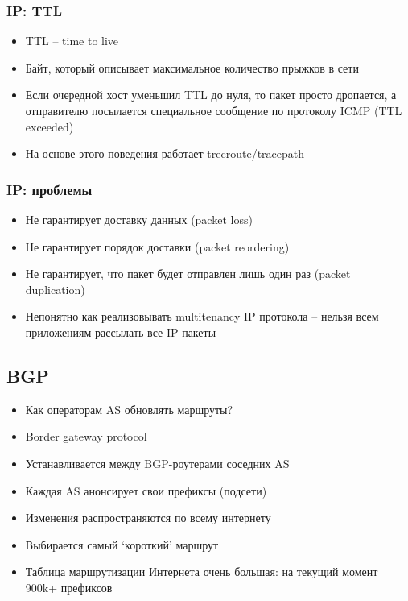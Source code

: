   \subsubsection{IP: TTL}
    \begin{itemize}
      \item TTL -- time to live
      \item Байт, который описывает максимальное количество прыжков в сети
      \item Если очередной хост уменьшил TTL до нуля, то пакет просто дропается, а отправителю посылается специальное сообщение по протоколу ICMP (TTL exceeded)
      \item На основе этого поведения работает trecroute/tracepath
    \end{itemize}
  
  \subsubsection{IP: проблемы}
    \begin{itemize}
      \item Не гарантирует доставку данных (packet loss)
      \item Не гарантирует порядок доставки (packet reordering)
      \item Не гарантирует, что пакет будет отправлен лишь один раз (packet duplication)
      \item Непонятно как реализовывать multitenancy IP протокола – нельзя всем приложениям рассылать все IP-пакеты
    \end{itemize}
  
  \subsection{BGP}
    \begin{itemize}
      \item Как операторам AS обновлять маршруты?
      \item Border gateway protocol 
      \item Устанавливается между BGP-роутерами соседних AS
      \item Каждая AS анонсирует свои префиксы (подсети)
      \item Изменения распространяются по всему интернету
      \item Выбирается самый `короткий' маршрут
      \item Таблица маршрутизации Интернета очень большая: на текущий момент 900k+ префиксов
    \end{itemize}
  
